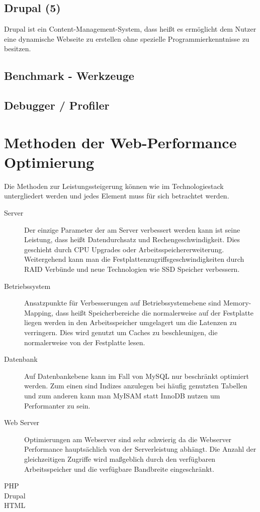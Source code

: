 \subsection{Drupal (5)}
Drupal ist ein Content-Management-System, dass heißt es ermöglicht dem Nutzer eine dynamische Webseite zu erstellen ohne spezielle Programmierkenntnisse zu besitzen. 
\subsection{Benchmark - Werkzeuge}
\subsection{Debugger / Profiler}
\section{Methoden der Web-Performance Optimierung}
Die Methoden zur Leistungssteigerung können wie im Technologiestack untergliedert werden und jedes Element muss für sich betrachtet werden.

\begin{description}
  \item[Server] Der einzige Parameter der am Server verbessert werden kann ist seine Leistung, dass heißt Datendurchsatz und Rechengeschwindigkeit. Dies geschieht durch CPU Upgrades oder Arbeitsspeichererweiterung. Weitergehend kann man die Festplattenzugriffsgeschwindigkeiten durch RAID Verbünde und neue Technologien wie SSD Speicher verbessern. 
  \item[Betriebssystem] Ansatzpunkte für Verbesserungen auf Betriebssystemebene sind Memory-Mapping, dass heißt Speicherbereiche die normalerweise auf der Festplatte liegen werden in den Arbeitsspeicher umgelagert um die Latenzen zu verringern. Dies wird genutzt um Caches zu beschleunigen, die normalerweise von der Festplatte lesen.
  \item[Datenbank] Auf Datenbankebene kann im Fall von MySQL nur beschränkt optimiert werden. Zum einen sind Indizes anzulegen bei häufig genutzten Tabellen und zum anderen kann man MyISAM statt InnoDB nutzen um Performanter zu sein.
  \item[Web Server] Optimierungen am Webserver sind sehr schwierig da die Webserver Performance hauptsächlich von der Serverleistung abhängt. Die Anzahl der gleichzeitigen Zugriffe wird maßgeblich durch den verfügbaren Arbeitsspeicher und die verfügbare Bandbreite eingeschränkt.
  \item[PHP] 
  \item[Drupal] 
  \item[HTML] 
\end{description}


%
%
